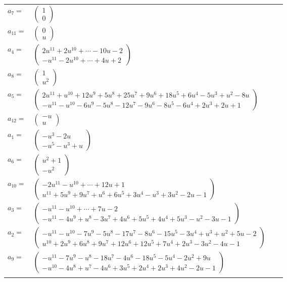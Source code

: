 \documentclass[1p]{elsarticle_modified}
\theoremstyle{definition}
\begin{document}
\begin{tabular}{m{7pt} m{180pt} m{7pt} m{180pt} }
\flushright $a_{7}=$&$\begin{pmatrix}1\\0\end{pmatrix}$ \\
\flushright $a_{11}=$&$\begin{pmatrix}0\\u\end{pmatrix}$ \\
\flushright $a_{4}=$&$\begin{pmatrix}2 u^{11}+2 u^{10}+\cdots-10 u-2\\- u^{11}-2 u^{10}+\cdots+4 u+2\end{pmatrix}$ \\
\flushright $a_{8}=$&$\begin{pmatrix}1\\u^2\end{pmatrix}$ \\
\flushright $a_{5}=$&$\begin{pmatrix}2 u^{11}+u^{10}+12 u^9+5 u^8+25 u^7+9 u^6+18 u^5+6 u^4-5 u^3+u^2-8 u\\- u^{11}- u^{10}-6 u^9-5 u^8-12 u^7-9 u^6-8 u^5-6 u^4+2 u^3+2 u+1\end{pmatrix}$ \\
\flushright $a_{12}=$&$\begin{pmatrix}- u\\u\end{pmatrix}$ \\
\flushright $a_{1}=$&$\begin{pmatrix}- u^3-2 u\\- u^5- u^3+u\end{pmatrix}$ \\
\flushright $a_{6}=$&$\begin{pmatrix}u^2+1\\- u^2\end{pmatrix}$ \\
\flushright $a_{10}=$&$\begin{pmatrix}-2 u^{11}- u^{10}+\cdots+12 u+1\\u^{11}+5 u^9+9 u^7+u^6+6 u^5+3 u^4- u^3+3 u^2-2 u-1\end{pmatrix}$ \\
\flushright $a_{3}=$&$\begin{pmatrix}- u^{11}- u^{10}+\cdots+7 u-2\\- u^{11}-4 u^9+u^8-3 u^7+4 u^6+5 u^5+4 u^4+5 u^3- u^2-3 u-1\end{pmatrix}$ \\
\flushright $a_{2}=$&$\begin{pmatrix}- u^{11}- u^{10}-7 u^9-5 u^8-17 u^7-8 u^6-15 u^5-3 u^4+u^3+u^2+5 u-2\\u^{10}+2 u^9+6 u^8+9 u^7+12 u^6+12 u^5+7 u^4+2 u^3-3 u^2-4 u-1\end{pmatrix}$ \\
\flushright $a_{9}=$&$\begin{pmatrix}- u^{11}-7 u^9- u^8-18 u^7-4 u^6-18 u^5-5 u^4-2 u^2+9 u\\- u^{10}-4 u^8+u^7-4 u^6+3 u^5+2 u^4+2 u^3+4 u^2-2 u-1\end{pmatrix}$\\&\end{tabular}
\end{document}
